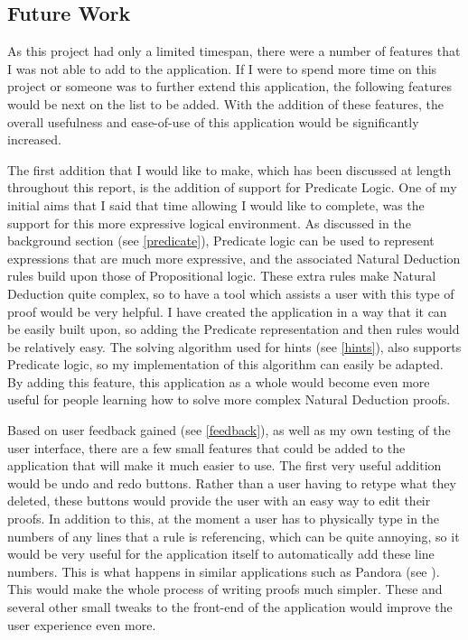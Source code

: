 \subsection{Future Work}

As this project had only a limited timespan, there were a number of features that I was not able to add to the application. If I were to spend more time on this project or someone was to further extend this application, the following features would be next on the list to be added. With the addition of these features, the overall usefulness and ease-of-use of this application would be significantly increased. 

The first addition that I would like to make, which has been discussed at length throughout this report, is the addition of support for Predicate Logic. One of my initial aims that I said that time allowing I would like to complete, was the support for this more expressive logical environment. As discussed in the background section (see \ref{predicate}), Predicate logic can be used to represent expressions that are much more expressive, and the associated Natural Deduction rules build upon those of Propositional logic. These extra rules make Natural Deduction quite complex, so to have a tool which assists a user with this type of proof would be very helpful. I have created the application in a way that it can be easily built upon, so adding the Predicate representation and then rules would be relatively easy. The solving algorithm used for hints (see \ref{hints}), also supports Predicate logic, so my implementation of this algorithm can easily be adapted. By adding this feature, this application as a whole would become even more useful for people learning how to solve more complex Natural Deduction proofs.

Based on user feedback gained (see \ref{feedback}), as well as my own testing of the user interface, there are a few small features that could be added to the application that will make it much easier to use. The first very useful addition would be undo and redo buttons. Rather than a user having to retype what they deleted, these buttons would provide the user with an easy way to edit their proofs. In addition to this, at the moment a user has to physically type in the numbers of any lines that a rule is referencing, which can be quite annoying, so it would be very useful for the application itself to automatically add these line numbers. This is what happens in similar applications such as Pandora (see \cite{pandora}). This would make the whole process of writing proofs much simpler. These and several other small tweaks to the front-end of the application would improve the user experience even more.

